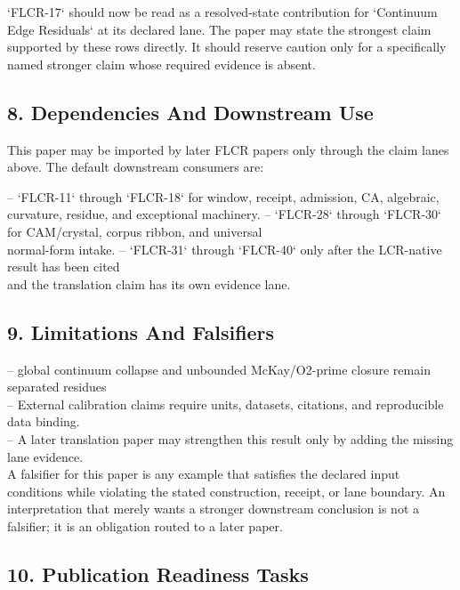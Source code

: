 \documentclass[11pt]{article}
\begin{document}
`FLCR-17` should now be read as a resolved-state contribution for `Continuum Edge Residuals` at its declared lane. The paper may state the strongest claim supported by these rows directly. It should reserve caution only for a specifically named stronger claim whose required evidence is absent.

\subsection*{8. Dependencies And Downstream Use}

This paper may be imported by later FLCR papers only through the claim lanes
above. The default downstream consumers are:

\noindent{}-- `FLCR-11` through `FLCR-18` for window, receipt, admission, CA, algebraic,\\
  curvature, residue, and exceptional machinery.
\noindent{}-- `FLCR-28` through `FLCR-30` for CAM/crystal, corpus ribbon, and universal\\
  normal-form intake.
\noindent{}-- `FLCR-31` through `FLCR-40` only after the LCR-native result has been cited\\
  and the translation claim has its own evidence lane.

\subsection*{9. Limitations And Falsifiers}

\noindent{}-- global continuum collapse and unbounded McKay/O2-prime closure remain separated residues\\
\noindent{}-- External calibration claims require units, datasets, citations, and reproducible data binding.\\
\noindent{}-- A later translation paper may strengthen this result only by adding the missing lane evidence.\\

A falsifier for this paper is any example that satisfies the declared input
conditions while violating the stated construction, receipt, or lane boundary.
An interpretation that merely wants a stronger downstream conclusion is not a
falsifier; it is an obligation routed to a later paper.

\subsection*{10. Publication Readiness Tasks}
\end{document}
